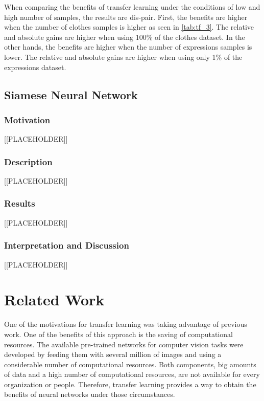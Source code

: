 \documentclass{article}
\begin{document}
When comparing the benefits of transfer learning under the conditions of low and high number of samples, the results are dis-pair. First, the benefits are higher when the number of clothes samples is higher as seen in \ref{tab:tf_3}. The relative and absolute gains are higher when using 100\% of the clothes dataset. In the other hands, the benefits are higher when the number of expressions samples is lower. The relative and absolute gains are higher when using only 1\% of the expressions dataset.

\subsection{Siamese Neural Network}

\subsubsection{\textbf{Motivation}}

[[PLACEHOLDER]]

\subsubsection{\textbf{Description}}

[[PLACEHOLDER]]

\subsubsection{\textbf{Results}}

[[PLACEHOLDER]]

\subsubsection{\textbf{Interpretation and Discussion}}

[[PLACEHOLDER]]

\section{Related Work}

One of the motivations for transfer learning was taking advantage of previous work. One of the benefits of this approach is the saving of computational resources. The available pre-trained networks for computer vision tasks were developed by feeding them with several million of images and using a considerable number of computational resources. Both components, big amounts of data and a high number of computational resources, are not available for every organization or people. Therefore, transfer learning provides a way to obtain the benefits of neural networks under those circumstances.
\end{document}
